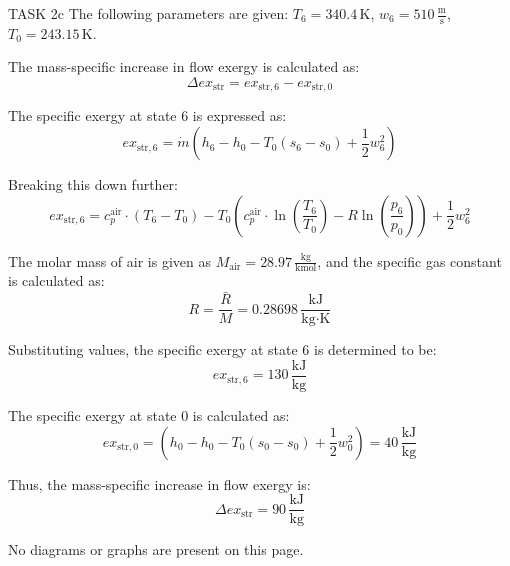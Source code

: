TASK 2c  
The following parameters are given:  
\( T_6 = 340.4 \, \text{K} \), \( w_6 = 510 \, \frac{\text{m}}{\text{s}} \), \( T_0 = 243.15 \, \text{K} \).  

The mass-specific increase in flow exergy is calculated as:  
\[
\Delta ex_{\text{str}} = ex_{\text{str},6} - ex_{\text{str},0}
\]  

The specific exergy at state 6 is expressed as:  
\[
ex_{\text{str},6} = \dot{m} \left( h_6 - h_0 - T_0 (s_6 - s_0) + \frac{1}{2} w_6^2 \right)
\]  

Breaking this down further:  
\[
ex_{\text{str},6} = c_p^{\text{air}} \cdot (T_6 - T_0) - T_0 \left( c_p^{\text{air}} \cdot \ln \left( \frac{T_6}{T_0} \right) - R \ln \left( \frac{p_6}{p_0} \right) \right) + \frac{1}{2} w_6^2
\]  

The molar mass of air is given as \( M_{\text{air}} = 28.97 \, \frac{\text{kg}}{\text{kmol}} \), and the specific gas constant is calculated as:  
\[
R = \frac{\bar{R}}{M} = 0.28698 \, \frac{\text{kJ}}{\text{kg·K}}
\]  

Substituting values, the specific exergy at state 6 is determined to be:  
\[
ex_{\text{str},6} = 130 \, \frac{\text{kJ}}{\text{kg}}
\]  

The specific exergy at state 0 is calculated as:  
\[
ex_{\text{str},0} = \left( h_0 - h_0 - T_0 (s_0 - s_0) + \frac{1}{2} w_0^2 \right) = 40 \, \frac{\text{kJ}}{\text{kg}}
\]  

Thus, the mass-specific increase in flow exergy is:  
\[
\Delta ex_{\text{str}} = 90 \, \frac{\text{kJ}}{\text{kg}}
\]  

No diagrams or graphs are present on this page.